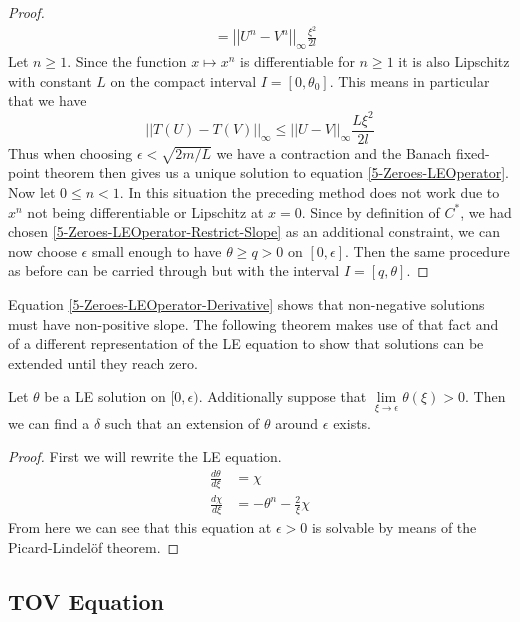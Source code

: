 \begin{proof}
\begin{align}
								&=		\left|\left|U^n-V^n\right|\right|_\infty\frac{\xi^2}{2l}
	\end{align}
	Let $n\geq1$. 
	Since the function $x\mapsto x^n$ is differentiable for $n\geq1$ it is also Lipschitz with constant $L$ on the compact interval $I=[0,\theta_0]$.
	This means in particular that we have
	\begin{equation}
		||T(U)-T(V)||_\infty	\leq	\left|\left|U-V\right|\right|_\infty\frac{L\xi^2}{2l}
	\end{equation}
	Thus when choosing $\epsilon<\sqrt{2m/L}$ we have a contraction and the Banach fixed-point theorem then gives us a unique solution to equation \ref{5-Zeroes-LEOperator}.\\
	Now let $0\leq n<1$.
	In this situation the preceding method does not work due to $x^n$ not being differentiable or Lipschitz at $x=0$. 
	Since by definition of $C^*$, we had chosen \eqref{5-Zeroes-LEOperator-Restrict-Slope} as an additional constraint, we can now choose $\epsilon$ small enough to have $\theta\geq q>0$ on $[0,\epsilon]$.
	Then the same procedure as before can be carried through but with the interval $I=[q,\theta]$.
\end{proof}
Equation \eqref{5-Zeroes-LEOperator-Derivative} shows that non-negative solutions must have non-positive slope.
The following theorem makes use of that fact and of a different representation of the \ac{LE} equation to show that solutions can be extended until they reach zero.
\begin{lemma}
	Let $\theta$ be a \ac{LE} solution on $[0,\epsilon)$. 
	Additionally suppose that $\lim\limits_{\xi\rightarrow\epsilon}\theta(\xi)>0$.
	Then we can find a $\delta$ such that an extension of $\theta$ around $\epsilon$ exists.
\end{lemma}
\begin{proof}
	First we will rewrite the \ac{LE} equation.
	\begin{align}
		\frac{d\theta}{d\xi} &= \chi\\
		\frac{d\chi}{d\xi} &= -\theta^n - \frac{2}{\xi}\chi
	\end{align}
	From here we can see that this equation at $\epsilon>0$ is solvable by means of the Picard-Lindelöf theorem.
	
\end{proof}
%
%
%
\subsection{TOV Equation}

%
%
%
